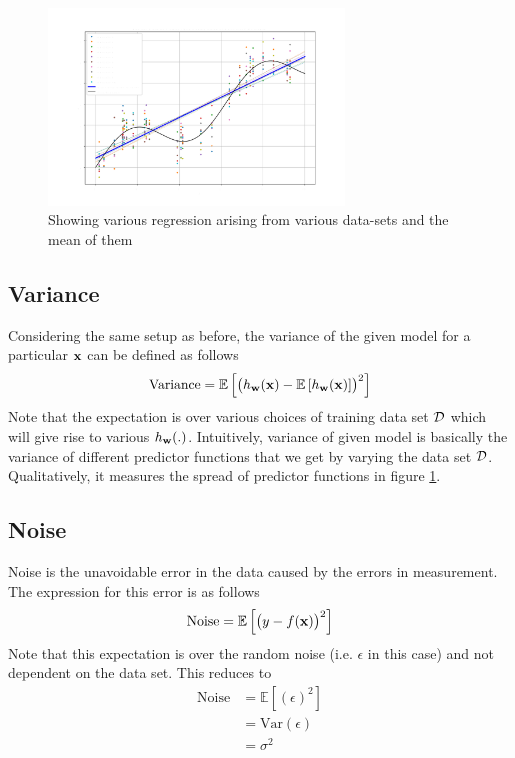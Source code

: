 \begin{figure}[H]
  \centerline{\includegraphics[width = 0.7\textwidth]{images/13.png}}
  \caption{Showing various regression arising from various data-sets and the mean of them}
  \label{fig}
\end{figure}

\subsection{Variance}

Considering the same setup as before, the variance of the given model for a particular \(\mathbf{x}\) can be defined as follows
\begin{equation}
  \text{Variance} = \mathbb{E}\left[\bigl(h_{\mathbf{w}}(\mathbf{x})-\mathbb{E}\left[h_{\mathbf{w}}(\mathbf{x})\right]\bigr)^2\right]
\end{equation}
Note that the expectation is over various choices of training data set \( \mathcal{D}\) which will give rise to various \(h_{\mathbf{w}}(.)\). Intuitively, variance of given model is basically the variance of different predictor functions that we get by varying the data set \( \mathcal{D}\). Qualitatively, it measures the spread of predictor functions in figure \ref{fig}.

\subsection{Noise}

Noise is the unavoidable error in the data caused by the errors in measurement. The expression for this error is as follows
\begin{equation}
  \text{Noise} = \mathbb{E}\left[\bigl(y-f(\mathbf{x})\bigr)^2\right]
\end{equation}
Note that this expectation is over the random noise (i.e. $\epsilon$ in this case) and not dependent on the data set. This reduces to
\begin{align*}
  \text{Noise} & = \mathbb{E}\left[(\epsilon)^2\right] \\
               & = \text{Var}(\epsilon)                \\
               & = \sigma^2
\end{align*}

